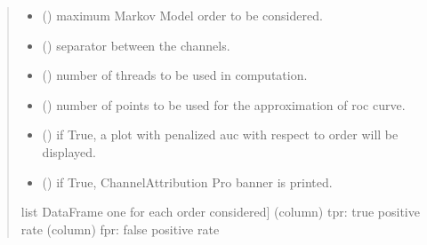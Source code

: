 \documentclass[letterpaper,10pt,english]{sphinxmanual}
\begin{document}
\begin{fulllineitems}
\begin{quote}
\begin{description}
\begin{itemize}
\item {} 
\sphinxAtStartPar
{} (\sphinxstyleliteralemphasis{\sphinxupquote{, }}) \textendash{} maximum Markov Model order to be considered.

\item {} 
\sphinxAtStartPar
{} (\sphinxstyleliteralemphasis{\sphinxupquote{, }}) \textendash{} separator between the channels.

\item {} 
\sphinxAtStartPar
{} (\sphinxstyleliteralemphasis{\sphinxupquote{, }}) \textendash{} number of threads to be used in computation.

\item {} 
\sphinxAtStartPar
{} (\sphinxstyleliteralemphasis{\sphinxupquote{, }}) \textendash{} number of points to be used for the approximation of roc curve.

\item {} 
\sphinxAtStartPar
{} (\sphinxstyleliteralemphasis{\sphinxupquote{, }}) \textendash{} if True, a plot with penalized auc with respect to order will be displayed.

\item {} 
\sphinxAtStartPar
{} (\sphinxstyleliteralemphasis{\sphinxupquote{, }}) \textendash{} if True, ChannelAttribution Pro banner is printed.

\end{itemize}

\sphinxAtStartPar
\begin{description}
\sphinxlineitem{roc}{[}list DataFrame one for each order considered{]}
\sphinxAtStartPar
(column) tpr: true positive rate
(column) fpr: false positive rate


\end{description}
\end{description}
\end{quote}
\end{fulllineitems}
\end{document}

